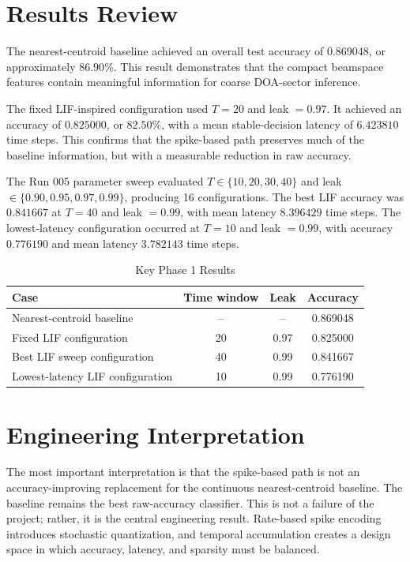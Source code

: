 \documentclass[11pt]{article}
\begin{document}
\section{Results Review}

The nearest-centroid baseline achieved an overall test accuracy of $0.869048$, or approximately $86.90\%$. This result demonstrates that the compact beamspace features contain meaningful information for coarse DOA-sector inference.

The fixed LIF-inspired configuration used $T=20$ and leak $=0.97$. It achieved an accuracy of $0.825000$, or $82.50\%$, with a mean stable-decision latency of $6.423810$ time steps. This confirms that the spike-based path preserves much of the baseline information, but with a measurable reduction in raw accuracy.

The Run 005 parameter sweep evaluated $T\in\{10,20,30,40\}$ and leak $\in\{0.90,0.95,0.97,0.99\}$, producing 16 configurations. The best LIF accuracy was $0.841667$ at $T=40$ and leak $=0.99$, with mean latency $8.396429$ time steps. The lowest-latency configuration occurred at $T=10$ and leak $=0.99$, with accuracy $0.776190$ and mean latency $3.782143$ time steps.

\begin{table}[h]
\centering
\caption{Key Phase 1 Results}
\begin{tabular}{lccc}
\toprule
Case & Time window & Leak & Accuracy \\
\midrule
Nearest-centroid baseline & -- & -- & 0.869048 \\
Fixed LIF configuration & 20 & 0.97 & 0.825000 \\
Best LIF sweep configuration & 40 & 0.99 & 0.841667 \\
Lowest-latency LIF configuration & 10 & 0.99 & 0.776190 \\
\bottomrule
\end{tabular}
\end{table}

\section{Engineering Interpretation}

The most important interpretation is that the spike-based path is not an accuracy-improving replacement for the continuous nearest-centroid baseline. The baseline remains the best raw-accuracy classifier. This is not a failure of the project; rather, it is the central engineering result. Rate-based spike encoding introduces stochastic quantization, and temporal accumulation creates a design space in which accuracy, latency, and sparsity must be balanced.
\end{document}
